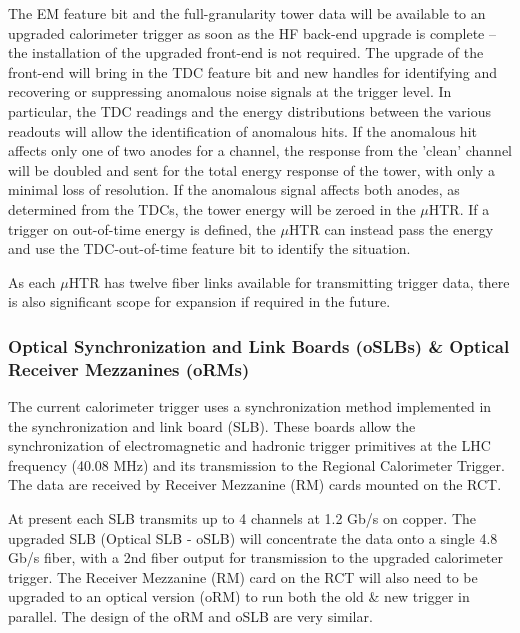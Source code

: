 The EM feature bit and the full-granularity tower data will be
available to an upgraded calorimeter trigger as soon as the HF
back-end upgrade is complete -- the installation of the upgraded
front-end is not required.  The upgrade of the front-end will bring in
the TDC feature bit and new handles for identifying and recovering or
suppressing anomalous noise signals at the trigger level.  In
particular, the TDC readings and the energy distributions between the
various readouts will allow the identification of anomalous hits.  If
the anomalous hit affects only one of two anodes for a channel, the
response from the 'clean' channel will be doubled and sent for the
total energy response of the tower, with only a minimal loss of
resolution.  If the anomalous signal affects both anodes, as
determined from the TDCs, the tower energy will be zeroed in the $\mu$HTR.
If a trigger on out-of-time energy is defined, the $\mu$HTR can instead
pass the energy and use the TDC-out-of-time feature bit to identify
the situation.

As each $\mu$HTR has twelve fiber links available for transmitting trigger
data, there is also significant scope for expansion if required in the
future.

\subsubsection{Optical Synchronization and Link Boards (oSLBs) \& Optical Receiver Mezzanines (oRMs)}

The current calorimeter trigger uses a synchronization method
implemented in the synchronization and link board (SLB). These boards
allow the synchronization of electromagnetic and hadronic trigger
primitives at the LHC frequency (40.08 MHz) and its transmission to
the Regional Calorimeter Trigger. The data are received by Receiver
Mezzanine (RM) cards mounted on the RCT.   

At present each SLB transmits up to 4 channels at 1.2 Gb/s on copper.  The upgraded SLB (Optical SLB - oSLB) will concentrate the data onto a single 4.8 Gb/s fiber, with a 2nd fiber output for transmission to the upgraded calorimeter trigger.  The Receiver Mezzanine (RM) card on the RCT will also need to be upgraded to an optical version (oRM) to run both the old \& new trigger in parallel.  The design of the oRM and oSLB are very similar.

